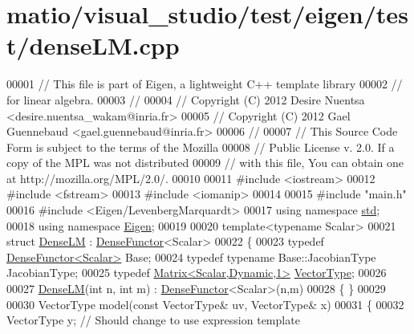 \hypertarget{matio_2visual__studio_2test_2eigen_2test_2dense_l_m_8cpp_source}{}\section{matio/visual\+\_\+studio/test/eigen/test/dense\+LM.cpp}
\label{matio_2visual__studio_2test_2eigen_2test_2dense_l_m_8cpp_source}

\begin{DoxyCode}
00001 \textcolor{comment}{// This file is part of Eigen, a lightweight C++ template library}
00002 \textcolor{comment}{// for linear algebra.}
00003 \textcolor{comment}{//}
00004 \textcolor{comment}{// Copyright (C) 2012 Desire Nuentsa <desire.nuentsa\_wakam@inria.fr>}
00005 \textcolor{comment}{// Copyright (C) 2012 Gael Guennebaud <gael.guennebaud@inria.fr>}
00006 \textcolor{comment}{//}
00007 \textcolor{comment}{// This Source Code Form is subject to the terms of the Mozilla}
00008 \textcolor{comment}{// Public License v. 2.0. If a copy of the MPL was not distributed}
00009 \textcolor{comment}{// with this file, You can obtain one at http://mozilla.org/MPL/2.0/.}
00010 
00011 \textcolor{preprocessor}{#include <iostream>}
00012 \textcolor{preprocessor}{#include <fstream>}
00013 \textcolor{preprocessor}{#include <iomanip>}
00014 
00015 \textcolor{preprocessor}{#include "main.h"}
00016 \textcolor{preprocessor}{#include <Eigen/LevenbergMarquardt>}
00017 \textcolor{keyword}{using namespace }\hyperlink{namespacestd}{std};
00018 \textcolor{keyword}{using namespace }\hyperlink{namespace_eigen}{Eigen};
00019 
00020 \textcolor{keyword}{template}<\textcolor{keyword}{typename} Scalar>
00021 \textcolor{keyword}{struct }\hyperlink{struct_dense_l_m}{DenseLM} : \hyperlink{struct_eigen_1_1_dense_functor}{DenseFunctor}<Scalar>
00022 \{
00023   \textcolor{keyword}{typedef} \hyperlink{struct_eigen_1_1_dense_functor}{DenseFunctor<Scalar>} Base;
00024   \textcolor{keyword}{typedef} \textcolor{keyword}{typename} Base::JacobianType JacobianType;
00025   \textcolor{keyword}{typedef} \hyperlink{group___core___module}{Matrix<Scalar,Dynamic,1>} \hyperlink{struct_vector_type}{VectorType};
00026   
00027   \hyperlink{struct_dense_l_m}{DenseLM}(\textcolor{keywordtype}{int} n, \textcolor{keywordtype}{int} m) : \hyperlink{struct_eigen_1_1_dense_functor}{DenseFunctor}<Scalar>(n,m) 
00028   \{ \}
00029  
00030   VectorType model(\textcolor{keyword}{const} VectorType& uv, VectorType& x)
00031   \{
00032     VectorType y; \textcolor{comment}{// Should change to use expression template}

\end{DoxyCode}
